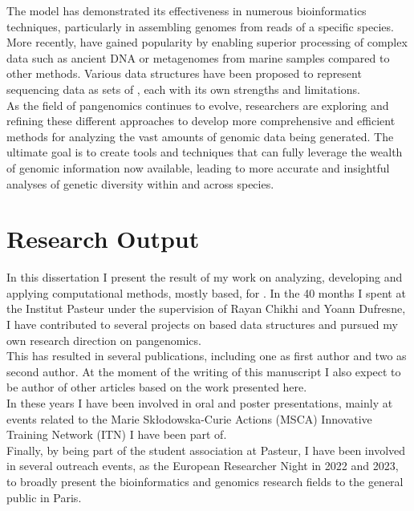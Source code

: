 The \kmer model has demonstrated its effectiveness in numerous bioinformatics techniques, particularly in assembling genomes from reads of a specific species. More recently, \kmers have gained popularity by enabling superior processing of complex data such as ancient DNA or metagenomes from marine samples compared to other methods. Various data structures have been proposed to represent sequencing data as sets of \kmers, each with its own strengths and limitations.\\
As the field of pangenomics continues to evolve, researchers are exploring and refining these different approaches to develop more comprehensive and efficient methods for analyzing the vast amounts of genomic data being generated. The ultimate goal is to create tools and techniques that can fully leverage the wealth of genomic information now available, leading to more accurate and insightful analyses of genetic diversity within and across species.\\
\section{Research Output}
In this dissertation I present the result of my work on analyzing, developing and applying computational methods, mostly \kmer based, for \pangenomics. In the 40 months I spent at the Institut Pasteur under the supervision of Rayan Chikhi and Yoann Dufresne, I have contributed to several projects on \kmer based data structures and pursued my own research direction on pangenomics.\\
This has resulted in several publications, including one as first author and two as second author. At the moment of the writing of this manuscript I also expect to be author of other articles based on the work presented here.\\
In these years I have been involved in oral and poster presentations, mainly at events related to the Marie Skłodowska-Curie Actions (MSCA) Innovative Training Network (ITN) I have been part of.\\
Finally, by being part of the student association at Pasteur, I have been involved in several outreach events, as the European Researcher Night in 2022 and 2023, to broadly present the bioinformatics and genomics research fields to the general public in Paris.
